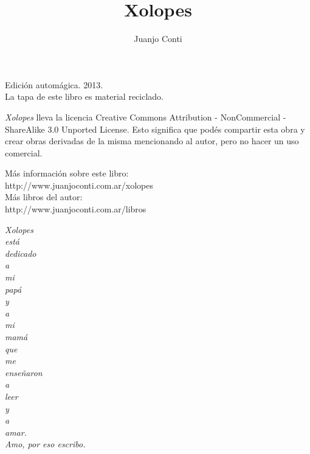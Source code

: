 \documentclass[12pt,twoside,openright,a5paper]{book}
\title{Xolopes}
\author{Juanjo Conti}
\date{}
\begin{document}
\pagestyle{plain}

\maketitle

\cleardoublepage

\thispagestyle{empty}
\noindent
Edición automágica. 2013.\\
La tapa de este libro es material reciclado.

\vspace{0.5cm}

\noindent
\emph{Xolopes} lleva la licencia 
Creative Commons Attribution - NonCommercial - ShareAlike 3.0 Unported License.
Esto significa que podés compartir esta obra y crear obras derivadas de la misma
mencionando al autor, pero no ha\-cer un uso comercial.

\vfill

\noindent
Más información sobre este libro:\\
http://www.juanjoconti.com.ar/xolopes\\

\noindent
Más libros del autor:\\
http://www.juanjoconti.com.ar/libros

\cleardoublepage

\noindent
\begin{flushright}
\emph{
\emph{Xolopes} \\está \\dedicado \\a \\mi \\papá \\y \\a \\mi \\mamá\\
que \\me \\enseñaron \\a \\leer \\y \\a \\amar.\\
\vspace{0.5cm}
Amo, por eso escribo.
}

\end{flushright}
\end{document}
